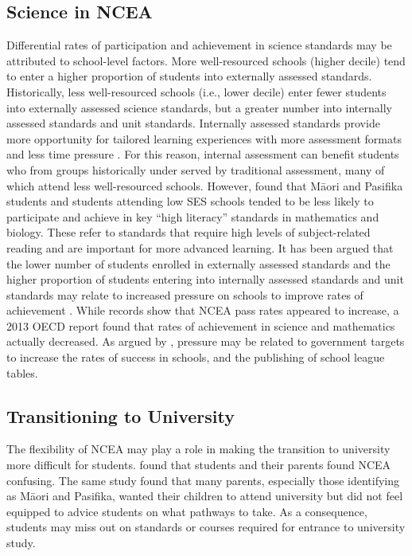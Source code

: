 \documentclass[a4paper,man,natbib]{apa6}
\begin{document}
\subsection{Science in NCEA}
Differential rates of participation and achievement in science standards may be attributed to school-level factors. More well-resourced schools (higher decile) tend to enter a higher proportion of students into externally assessed standards. Historically, less well-resourced schools (i.e., lower decile) enter fewer students into externally assessed science standards, but a greater number into internally assessed standards and unit standards. Internally assessed standards provide more opportunity for tailored learning experiences with more assessment formats and less time pressure \cite{hipkins}. For this reason, internal assessment can benefit students who from groups historically under served by traditional assessment, many of which attend less well-resourced schools. However, \cite{wilson2017subject} found that M\={a}ori and Pasifika students and students attending low SES schools tended to be less likely to participate and achieve in key ``high literacy'' standards in mathematics and biology. These refer to standards that require high levels of subject-related reading and are important for more advanced learning. It has been argued that the lower number of students enrolled in externally assessed standards and the higher proportion of students entering into internally assessed standards and unit standards may relate to increased pressure on schools to improve rates of achievement \cite{hipkins,wilson2017subject}. While records show that NCEA pass rates appeared to increase, a 2013 OECD report found that rates of achievement in science and mathematics actually decreased. As argued by \cite{wilson2017subject}, pressure may be related to government targets to increase the rates of success in schools, and the publishing of school league tables. 

\subsection{Transitioning to University}
The flexibility of NCEA may play a role in making the transition to university more difficult for students. \cite{jensen2010ncea} found that students and their parents found NCEA confusing. The same study found that many parents, especially those identifying as M\={a}ori and Pasifika, wanted their children to attend university but did not feel equipped to advice students on what pathways to take. As a consequence, students may miss out on standards or courses required for entrance to university study. 
\end{document}
